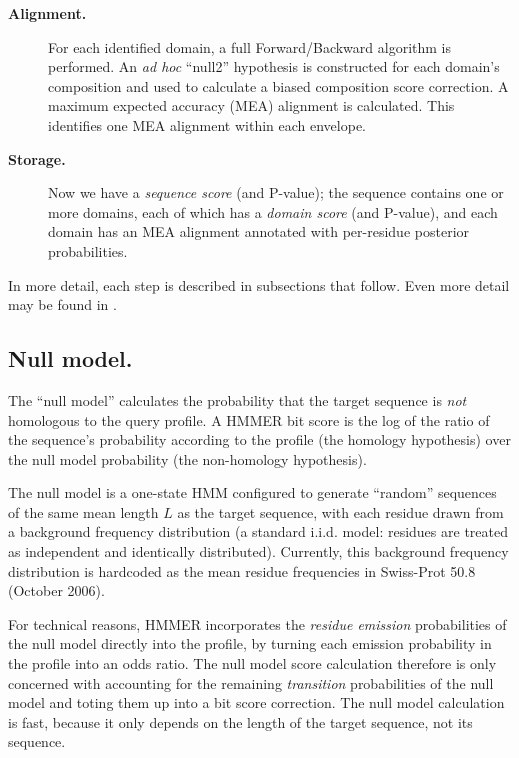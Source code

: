 \begin{description}
\item[\textbf{Alignment.}] For each identified domain, a full
  Forward/Backward algorithm is performed. An \emph{ad hoc} ``null2''
  hypothesis is constructed for each domain's composition and used to
  calculate a biased composition score correction. A maximum expected
  accuracy (MEA) alignment is calculated. This identifies one MEA
  alignment within each envelope.

\item[\textbf{Storage.}] Now we have a \emph{sequence score} (and
  P-value); the sequence contains one or more domains, each of which
  has a \emph{domain score} (and P-value), and each domain has an MEA
  alignment annotated with per-residue posterior probabilities.

\end{description}

In more detail, each step is described in subsections that follow. Even more
detail may be found in \citep{Eddy11}.

\subsection{Null model.}

The ``null model'' calculates the probability that the target sequence
is \emph{not} homologous to the query profile. A HMMER bit score is
the log of the ratio of the sequence's probability according to the
profile (the homology hypothesis) over the null model probability (the
non-homology hypothesis). 

The null model is a one-state HMM configured to generate ``random''
sequences of the same mean length $L$ as the target sequence, with
each residue drawn from a background frequency distribution (a
standard i.i.d. model: residues are treated as independent and
identically distributed). Currently, this background frequency
distribution is hardcoded as the mean residue frequencies in Swiss-Prot
50.8 (October 2006).

For technical reasons, HMMER incorporates the \emph{residue emission}
probabilities of the null model directly into the profile, by turning
each emission probability in the profile into an odds ratio. The null
model score calculation therefore is only concerned with accounting
for the remaining \emph{transition} probabilities of the null model
and toting them up into a bit score correction.  The null model
calculation is fast, because it only depends on the length of the
target sequence, not its sequence.

